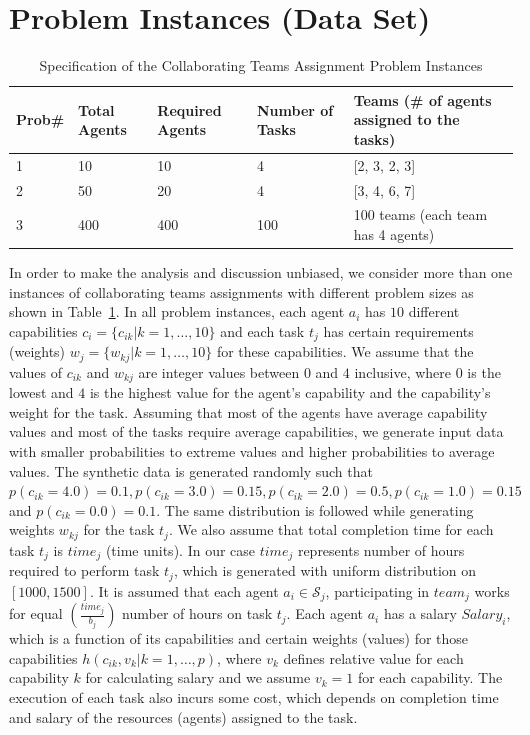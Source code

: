 \documentclass{sig-alternate}
\begin{document}
\section{Problem Instances (Data Set)}\label{sec: experiments}


\begin{table}[ht!]
\scriptsize
\caption{Specification of the Collaborating Teams Assignment Problem Instances}
\centering

\begin{tabular}{p{0.30in} p{0.49in} p{0.49in} p{0.50in} p{4.2in}}
  \hline\hline
  Prob\# & Total Agents & Required Agents&  Number of Tasks &  
  Teams (\# of agents assigned to the tasks)  \\ [0.5ex] %
  \hline 
  1 & 10 & 10 & 4 & [2, 3, 2, 3]  \\ 
  2 & 50 & 20 & 4 & [3, 4, 6, 7]  \\
  3 & 400 & 400 & 100 & 100 teams (each team has 4 agents)  \\
  \hline
\end{tabular}
\label{table:teamsFormulationDataSet}
\end{table}


In order to make the analysis and discussion unbiased, we consider 
more than one instances of collaborating teams assignments with different 
problem sizes as shown in Table~\ref{table:teamsFormulationDataSet}. In all 
problem instances, each agent $a_i$ has $10$ different 
capabilities $c_i = \{c_{ik}|k=1, \dots, 10\}$ and each task $t_j$ has certain 
requirements (weights) $w_j = \{w_{kj}|k=1, \dots, 10\}$ for 
these capabilities. We assume that the values of $c_{ik}$ and $w_{kj}$ are 
integer values between $0$ and $4$ inclusive, where $0$ is the lowest and $4$ 
is the highest value for the agent's capability and the capability's weight 
for the task. 
Assuming that most of the agents have average capability values and most 
of the tasks require average capabilities, we generate 
input data with smaller probabilities to extreme values and higher 
probabilities to average values. The synthetic data is generated randomly such 
that $p(c_{ik}=4.0) = 0.1, p(c_{ik}=3.0) = 0.15, p(c_{ik}=2.0) = 0.5, p(c_{ik}=1.0) = 0.15$ and $p(c_{ik}=0.0) = 0.1$. 
The same distribution is followed while generating weights $w_{kj}$ for the 
task $t_j$. We also assume that total completion time for each task $t_j$ is 
$time_j$ (time units). In our case $time_j$ represents number of hours required 
to perform task $t_j$, which is generated with uniform distribution 
on $[1000 ,1500]$. 
It is assumed that each agent $a_i \in \mathcal{S}_j$, participating 
in $team_j$ works 
for equal $\left(\frac{time_j}{b_j}\right)$ number of hours on task $t_{j}$. 
Each agent $a_i$ has a salary $Salary_i$, which is a function of its 
capabilities and certain weights (values) for those 
capabilities $h(c_{ik}, v_{k}|k=1, \dots, p)$, where $v_{k}$ defines relative 
value for each capability $k$ for calculating salary and we assume $v_{k}=1$ 
for each capability. The execution of each task also incurs some cost, which 
depends on completion time and salary of the resources (agents) assigned to 
the task.
\end{document}
